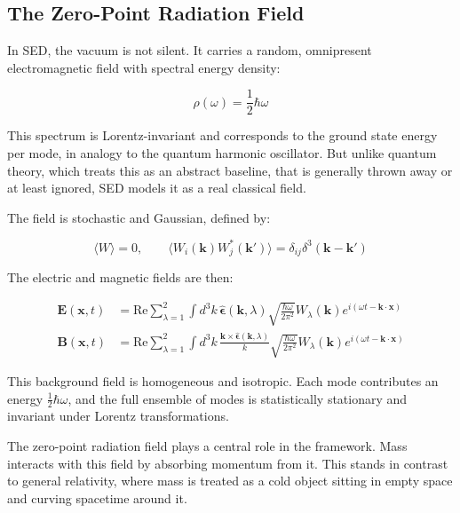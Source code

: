 \documentclass {article}
\renewcommand\vec{\mathbf}
\let\OldHat\hat
\renewcommand{\hat}[1]{\OldHat{\mathbf{#1}}}
\begin{document}
\subsection{The Zero-Point Radiation Field}

In SED, the vacuum is not silent. It carries a random, omnipresent electromagnetic field with spectral energy density:

\begin{equation}
\rho(\omega) = \frac{1}{2} \hbar \omega
\end{equation}

This spectrum is Lorentz-invariant and corresponds to the ground state energy per mode, in analogy to the quantum harmonic oscillator. But unlike quantum theory, which treats this as an abstract baseline, that is generally thrown away or at least ignored, SED models it as a real classical field.

The field is stochastic and Gaussian, defined by:

\begin{equation}
\langle W \rangle = 0, \qquad 
\langle W_i(\vec{k}) W_j^*(\vec{k}') \rangle = \delta_{ij} \delta^3(\vec{k} - \vec{k}')
\end{equation}

The electric and magnetic fields are then:

\begin{equation}
\begin{aligned}
\vec{E}(\vec{x}, t) &= \text{Re} \sum_{\lambda=1}^2 \int d^3k \, 
\hat{\epsilon}(\vec{k}, \lambda) 
\sqrt{\frac{\hbar \omega}{2\pi^2}} 
W_\lambda(\vec{k}) e^{i(\omega t - \vec{k} \cdot \vec{x})} \\
\vec{B}(\vec{x}, t) &= \text{Re} \sum_{\lambda=1}^2 \int d^3k \, 
\frac{\vec{k} \times \hat{\epsilon}(\vec{k}, \lambda)}{k}
\sqrt{\frac{\hbar \omega}{2\pi^2}} 
W_\lambda(\vec{k}) e^{i(\omega t - \vec{k} \cdot \vec{x})}
\end{aligned}
\end{equation}

This background field is homogeneous and isotropic. Each mode contributes an energy \( \tfrac{1}{2} \hbar \omega \), and the full ensemble of modes is statistically stationary and invariant under Lorentz transformations.


The zero-point radiation field plays a central role in the framework. Mass interacts with this field by absorbing momentum from it. This stands in contrast to general relativity, where mass is treated as a cold object sitting in empty space and curving spacetime around it.
\end{document}
